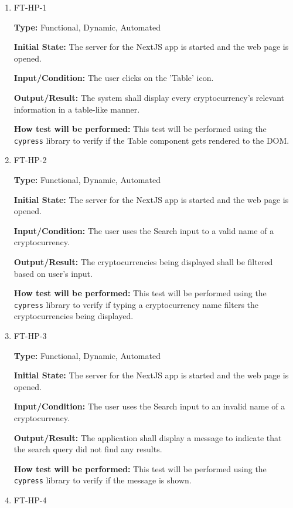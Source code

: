 \documentclass[12pt, titlepage]{article}
\begin{document}
\begin{enumerate}

\item{FT-HP-1}

\textbf{Type:} Functional, Dynamic, Automated
					
\textbf{Initial State:} The server for the NextJS app is started and the web page is opened.
					
\textbf{Input/Condition:} The user clicks on the 'Table' icon.
					
\textbf{Output/Result:} The system shall display every cryptocurrency’s relevant information in a table-like manner.
					
\textbf{How test will be performed:} This test will be performed using the \texttt{cypress} library to verify if the Table component gets rendered to the DOM.
					
\item{FT-HP-2}

\textbf{Type:} Functional, Dynamic, Automated
					
\textbf{Initial State:} The server for the NextJS app is started and the web page is opened.
					
\textbf{Input/Condition:} The user uses the Search input to a valid name of a cryptocurrency.
					
\textbf{Output/Result:} The cryptocurrencies being displayed shall be filtered based on user's input.
					
\textbf{How test will be performed:} This test will be performed using the \texttt{cypress} library to verify if typing a cryptocurrency name filters the cryptocurrencies being displayed.

\item{FT-HP-3}

\textbf{Type:} Functional, Dynamic, Automated
					
\textbf{Initial State:} The server for the NextJS app is started and the web page is opened.
					
\textbf{Input/Condition:} The user uses the Search input to an invalid name of a cryptocurrency.
					
\textbf{Output/Result:} The application shall display a message to indicate that the search query did not find any results.
					
\textbf{How test will be performed:} This test will be performed using the \texttt{cypress} library to verify if the message is shown.

\item{FT-HP-4}


\end{enumerate}
\end{document}
